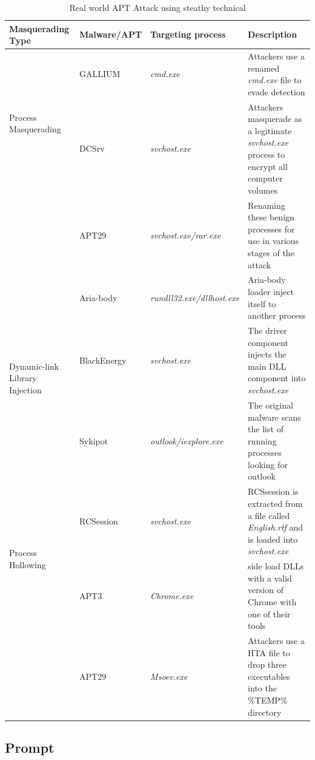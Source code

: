 \begin{table}
    \centering
    \begin{tabular}{|l|l|l|p{6cm}|}
        \hline
        Masquerading Type & Malware/APT & Targeting process & Description \\
        \hline
        \multirow{2}{*}{Process Masquerading}
        & GALLIUM\cite{cybereason2023} & \textit{cmd.exe} & Attackers use a renamed \textit{cmd.exe} file to evade detection \\
        \cline{2-4}
        & DCSrv\cite{checkpoint2021} & \textit{svchost.exe} & Attackers masquerade as a legitimate \textit{svchost.exe} process to encrypt all computer volumes \\
        \cline{2-4}
        & APT29\cite{mitre_g0016} & \textit{svchost.exe/rar.exe} & Renaming these benign processes for use in various stages of the attack \\
        \hline
        \multirow{3}{*}{Dynamic-link Library Injection} & Aria-body\cite{checkpoint2020} & \textit{rundll32.exe/dllhost.exe} & Aria-body loader inject itself to another process \\
        \cline{2-4}
        & BlackEnergy\cite{fsecure2019} & \textit{svchost.exe} & The driver component injects the main DLL component into \textit{svchost.exe} \\
        \cline{2-4}
        & Sykipot\cite{att2023} & \textit{outlook/iexplore.exe} & The original malware scans the list of running processes looking for outlook \\
        \hline
        \multirow{2}{*}{Process Hollowing} & RCSession\cite{secureworks} & \textit{svchost.exe} & RCSsession is extracted from a file called \textit{English.rtf} and is loaded into \textit{svchost.exe} \\
        \hline
        \multirow{2}{*}{Dll side-Loading} & APT3\cite{mitre_g0022} & \textit{Chrome.exe} & side load DLLs with a valid version of Chrome with one of their tools \\
        \cline{2-4}
        & APT29\cite{mitre_g0016} & \textit{Msoev.exe} & Attackers use a HTA file to drop three executables into the \%TEMP\% directory \\
        \hline
    \end{tabular}
    \caption{Real world APT Attack using steathy technical}
    \label{tab:real_world}
\end{table}




\subsection{Prompt}


